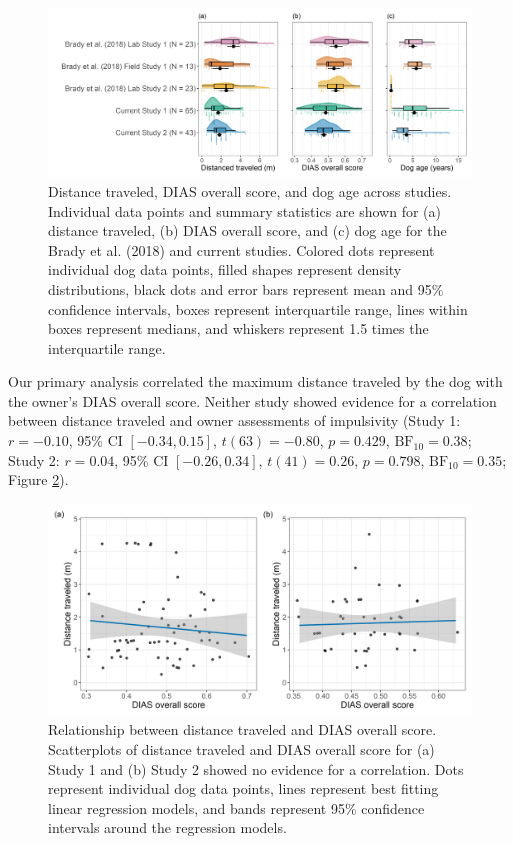 \documentclass[
  pub,floatsintext]{apa6}
\begin{document}
\begin{figure}

{\centering \includegraphics[width=1\linewidth]{figures/study_comparison} 

}

\caption{Distance traveled, DIAS overall score, and dog age across studies. Individual data points and summary statistics are shown for (a) distance traveled, (b) DIAS overall score, and (c) dog age for the Brady et al. (2018) and current studies. Colored dots represent individual dog data points, filled shapes represent density distributions, black dots and error bars represent mean and 95\% confidence intervals, boxes represent interquartile range, lines within boxes represent medians, and whiskers represent 1.5 times the interquartile range.}\label{fig:study-comp}
\end{figure}

Our primary analysis correlated the maximum distance traveled by the dog with the owner's DIAS overall score. Neither study showed evidence for a correlation between distance traveled and owner assessments of impulsivity (Study 1: \(r = -0.10\), 95\% CI \([-0.34, 0.15]\), \(t(63) = -0.80\), \(p = 0.429\), \(\mathrm{BF}_{\textrm{10}} = 0.38\); Study 2: \(r = 0.04\), 95\% CI \([-0.26, 0.34]\), \(t(41) = 0.26\), \(p = 0.798\), \(\mathrm{BF}_{\textrm{10}} = 0.35\); Figure \ref{fig:dias}).

\begin{figure}

{\centering \includegraphics[width=1\linewidth]{figures/distance_dias_overall} 

}

\caption{Relationship between distance traveled and DIAS overall score. Scatterplots of distance traveled and DIAS overall score for (a) Study 1 and (b) Study 2 showed no evidence for a correlation. Dots represent individual dog data points, lines represent best fitting linear regression models, and bands represent 95\% confidence intervals around the regression models.}\label{fig:dias}
\end{figure}
\end{document}
